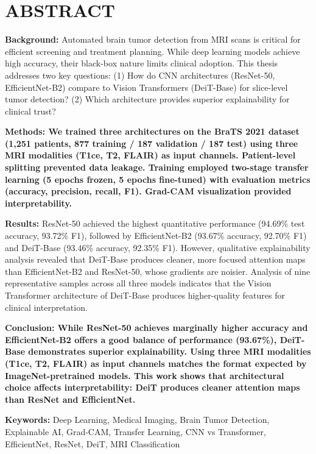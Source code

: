 \chapter*{ABSTRACT}

\textbf{Background:} Automated brain tumor detection from MRI scans is critical for efficient screening and treatment planning. While deep learning models achieve high accuracy, their black-box nature limits clinical adoption. This thesis addresses two key questions: (1) How do CNN architectures (ResNet-50, EfficientNet-B2) compare to Vision Transformers (DeiT-Base) for slice-level tumor detection? (2) Which architecture provides superior explainability for clinical trust?

\textbf{Methods: We trained three architectures on the BraTS 2021 dataset (1,251 patients, 877 training / 187 validation / 187 test) using three MRI modalities (T1ce, T2, FLAIR) as input channels. Patient-level splitting prevented data leakage. Training employed two-stage transfer learning (5 epochs frozen, 5 epochs fine-tuned) with evaluation metrics (accuracy, precision, recall, F1). Grad-CAM visualization provided interpretability.}

\textbf{Results:} ResNet-50 achieved the highest quantitative performance (94.69\% test accuracy, 93.72\% F1), followed by EfficientNet-B2 (93.67\% accuracy, 92.70\% F1) and DeiT-Base (93.46\% accuracy, 92.35\% F1). However, qualitative explainability analysis revealed that DeiT-Base produces cleaner, more focused attention maps than EfficientNet-B2 and ResNet-50, whose gradients are noisier. Analysis of nine representative samples across all three models indicates that the Vision Transformer architecture of DeiT-Base produces higher-quality features for clinical interpretation.

\textbf{Conclusion: While ResNet-50 achieves marginally higher accuracy and EfficientNet-B2 offers a good balance of performance (93.67\%), DeiT-Base demonstrates superior explainability. Using three MRI modalities (T1ce, T2, FLAIR) as input channels matches the format expected by ImageNet-pretrained models. This work shows that architectural choice affects interpretability: DeiT produces cleaner attention maps than ResNet and EfficientNet.}

\textbf{Keywords:} Deep Learning, Medical Imaging, Brain Tumor Detection, Explainable AI, Grad-CAM, Transfer Learning, CNN vs Transformer, EfficientNet, ResNet, DeiT, MRI Classification
